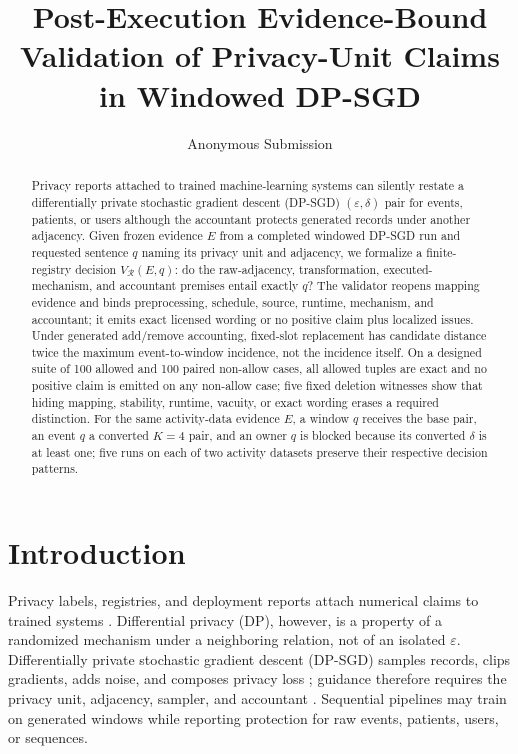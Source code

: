 \documentclass[letterpaper]{article} %
\title{Post-Execution Evidence-Bound Validation of Privacy-Unit Claims in Windowed DP-SGD}
\author{
Anonymous Submission
}
\begin{document}
\maketitle

\begin{abstract}
Privacy reports attached to trained machine-learning systems can silently restate a differentially private stochastic gradient descent (DP-SGD) $(\varepsilon,\delta)$ pair for events, patients, or users although the accountant protects generated records under another adjacency. Given frozen evidence $E$ from a completed windowed DP-SGD run and requested sentence $q$ naming its privacy unit and adjacency, we formalize a finite-registry decision $V_{\mathcal R}(E,q)$: do the raw-adjacency, transformation, executed-mechanism, and accountant premises entail exactly $q$? The validator reopens mapping evidence and binds preprocessing, schedule, source, runtime, mechanism, and accountant; it emits exact licensed wording or no positive claim plus localized issues. Under generated add/remove accounting, fixed-slot replacement has candidate distance twice the maximum event-to-window incidence, not the incidence itself. On a designed suite of 100 allowed and 100 paired non-allow cases, all allowed tuples are exact and no positive claim is emitted on any non-allow case; five fixed deletion witnesses show that hiding mapping, stability, runtime, vacuity, or exact wording erases a required distinction. For the same activity-data evidence $E$, a window $q$ receives the base pair, an event $q$ a converted $K=4$ pair, and an owner $q$ is blocked because its converted $\delta$ is at least one; five runs on each of two activity datasets preserve their respective decision patterns.
\end{abstract}

\section{Introduction}

Privacy labels, registries, and deployment reports attach numerical claims to trained systems \citep{nist2025registry,nanayakkara2025registry,dibia2026standard}. Differential privacy (DP), however, is a property of a randomized mechanism under a neighboring relation, not of an isolated $\varepsilon$. Differentially private stochastic gradient descent (DP-SGD) samples records, clips gradients, adds noise, and composes privacy loss \citep{abadi2016deep}; guidance therefore requires the privacy unit, adjacency, sampler, and accountant \citep{ponomareva2023dpfy,kifer2020guidelines,nist2025evaluation}. Sequential pipelines may train on generated windows while reporting protection for raw events, patients, users, or sequences.
\end{document}

